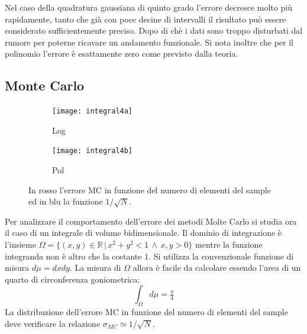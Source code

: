 Nel caso della quadratura gaussiana di quinto grado l'errore decresce molto più rapidamente, tanto che già con poce decine di intervalli il risultato può essere considerato sufficientemente preciso. Dopo di chè i dati sono troppo disturbati dal rumore per poterne ricavare un andamento funzionale. Si nota inoltre che per il polinomio l'errore è esattamente zero come previsto dalla teoria.
\\

\subsection{Monte Carlo}
\begin{figure}[H]
\begin{subfigure}[b]{0.5\textwidth}
\centering
\texttt{[image: integral4a]}
\caption{Log}
\end{subfigure}
\begin{subfigure}[b]{0.5\textwidth}
\centering
\texttt{[image: integral4b]}
\caption{Pol}
\end{subfigure}
\caption{In rosso l'errore MC in funzione del numero di elementi del sample ed in blu la funzione $1/\sqrt{N}$.}
\label{fig:integral4}
\end{figure}

Per analizzare il comportamento dell'errore dei metodi Molte Carlo si studia ora il caso di un integrale di volume bidimensionale. Il dominio di integrazione è l'insieme $\Omega = \{(x,y)\in \mathbb{R}\,|\, x^2+y^2<1\,\wedge\, x,y>0\}$ mentre la funzione integranda non è altro che la costante $1$. Si utilizza la convenzionale funzione di misura $d\mu=dxdy$. La misura di $\Omega$ allora è facile da calcolare essendo l'area di un quarto di circonferenza goniometrica: $$\int_\Omega d\mu = \tfrac{\pi}{4}$$
La distribuzione dell'errore MC in funzione del numero di elementi del sample deve verificare la relazione $\sigma_{MC}\simeq 1/\sqrt N$.
\\

